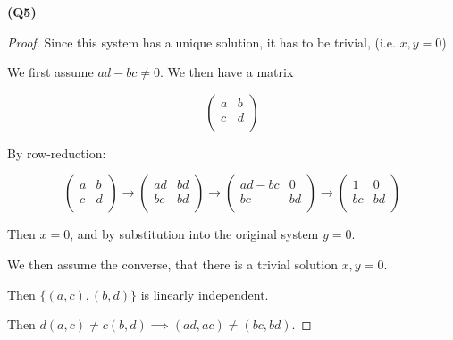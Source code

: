 \documentclass[12pt, a4paper]{article}
\begin{document}
\textbf{(Q5)}

\begin{proof}
    Since this system has a unique solution, it has to be trivial, (i.e. $x, y = 0$)

    We first assume $ad - bc \neq 0$. We then have a matrix
    

    \[
        \begin{pmatrix}
            a & b \\
            c & d \\
        \end{pmatrix}
    \]

    By row-reduction:

    \[
        \begin{pmatrix}
            a & b \\
            c & d \\
        \end{pmatrix}
        \rightarrow
        \begin{pmatrix}
            ad & bd \\
            bc & bd \\
        \end{pmatrix}
        \rightarrow
        \begin{pmatrix}
            ad - bc & 0 \\
            bc & bd \\
        \end{pmatrix}
        \rightarrow
        \begin{pmatrix}
            1 & 0 \\
            bc & bd \\
        \end{pmatrix}
    \]

    Then $x = 0$, and by substitution into the original system $y = 0$.

    We then assume the converse, that there is a trivial solution $x, y = 0$.

    Then $\{(a, c), (b, d)\}$ is linearly independent.

    Then $d(a, c) \neq c(b, d) \implies (ad, ac) \neq (bc, bd)$.
\end{proof}
\end{document}
